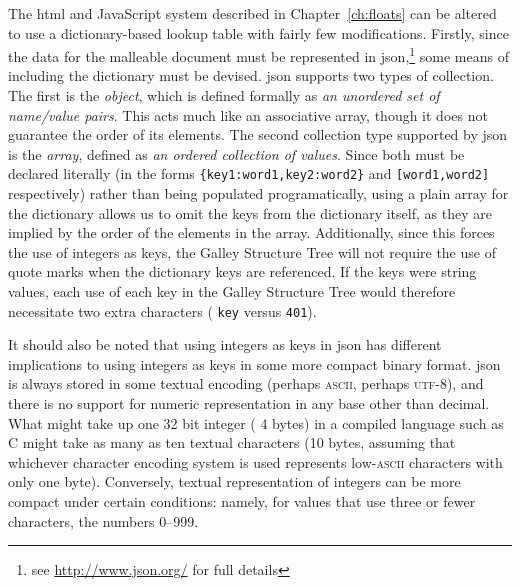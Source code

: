 The \gls{html} and JavaScript system described in Chapter~\ref{ch:floats} can be altered to use a dictionary-based lookup table with fairly few modifications. Firstly, since the data for the malleable document must be represented in \gls{json},\footnote{see \url{http://www.json.org/} for full details} some means of including the dictionary must be devised. \gls{json} supports two types of collection. The first is the \emph{object}, which is defined formally as \emph{an \mbox{unordered} set of name/value pairs}. This acts much like an associative array, though it does not guarantee the order of its elements. The second collection type supported by \gls{json} is the \emph{array}, defined as \emph{an ordered collection of values}. Since both must be declared literally (in the forms \texttt{\{\textquotedbl key1\textquotedbl:\textquotedbl word1\textquotedbl,\textquotedbl key2\textquotedbl:\textquotedbl word2\textquotedbl\}} and \texttt{[\textquotedbl word1\textquotedbl,\textquotedbl word2\textquotedbl]} respectively) rather than being populated programatically, using a plain array for the dictionary allows us to omit the keys from the dictionary itself, as they are implied by the order of the elements in the array. Additionally, since this forces the use of integers as keys, the Galley Structure Tree will not require the use of quote marks when the dictionary keys are referenced. If the keys were string values, each use of each key in the Galley Structure Tree would therefore necessitate two extra characters (\eg{} \texttt{\textquotedbl key\textquotedbl} versus \texttt{401}).

It should also be noted that using integers as keys in \gls{json} has different implications to using integers as keys in some more compact binary format. \gls{json} is always stored in some textual encoding (perhaps \textsc{ascii}, perhaps \textsc{utf-8}), and there is no support for numeric representation in any base other than decimal. What might take up one 32 bit integer (\ie{} 4 bytes) in a compiled language such as C might take as many as ten textual characters (10 bytes, assuming that whichever character encoding system is used represents low-\textsc{ascii} characters with only one byte). Conversely, textual representation of integers can be more compact under certain conditions: namely, for values that use three or fewer characters, \ie{} the numbers 0--999.

